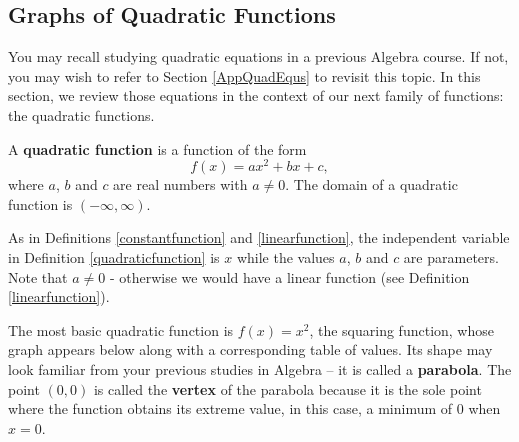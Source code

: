 \documentclass{ximera}
\begin{document}
	\author{Stitz-Zeager}




\setcounter{footnote}{0}

\label{QuadraticFunctions}

\subsection{Graphs of Quadratic Functions}
\label{GraphsofQuadraticFunctions}


You may recall studying quadratic equations in a previous Algebra course.  If not, you may wish to refer to Section \ref{AppQuadEqus} to revisit this topic. In this section, we review those equations in the context of our next family of functions: the quadratic functions.

\medskip

\colorbox{ResultColor}{\bbm

\begin{defn} \label{quadraticfunction} A \textbf{quadratic function} is a function of the form \[ f(x) = ax^2 + bx + c,\] where $a$, $b$ and $c$ are real numbers with $a \neq 0$.  The domain of a quadratic function is $(-\infty, \infty)$.

\end{defn}

\ebm}

\medskip

As in Definitions \ref{constantfunction} and \ref{linearfunction}, the independent variable in Definition \ref{quadraticfunction} is $x$ while the  values $a$, $b$ and $c$ are parameters. Note that $a \neq 0$ - otherwise we would have a linear function (see Definition  \ref{linearfunction}).

\medskip

The most basic quadratic function is $f(x) = x^2$, the squaring function, whose graph appears below along with a corresponding table of values. Its shape may look familiar from your previous studies in Algebra -- it is called a  \textbf{parabola}. The point $(0,0)$ is called the \textbf{vertex} of the parabola because it is the sole point where the function obtains its extreme value, in this case, a minimum of $0$ when $x = 0$. 
\end{document}
